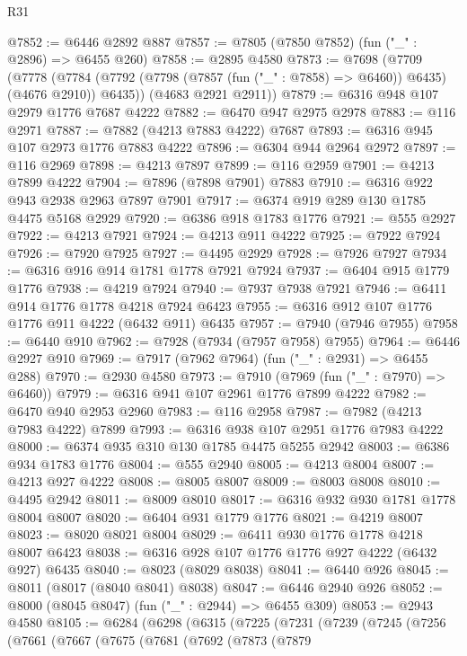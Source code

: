 \begin{lexlean}{R31}
\begin{coremodule}
@7852 := @6446 @2892 @887
@7857 := @7805 (@7850 @7852) (fun ("_" : @2896) => @6455 @260)
@7858 := @2895 @4580
@7873 := @7698
    (@7709
      (@7778 (@7784 (@7792 (@7798 (@7857 (fun ("_" : @7858) => @6460)) @6435) (@4676 @2910)) @6435))
      (@4683 @2921 @2911))
@7879 := @6316 @948 @107 @2979 @1776 @7687 @4222
@7882 := @6470 @947 @2975 @2978
@7883 := @116 @2971
@7887 := @7882 (@4213 @7883 @4222) @7687
@7893 := @6316 @945 @107 @2973 @1776 @7883 @4222
@7896 := @6304 @944 @2964 @2972
@7897 := @116 @2969
@7898 := @4213 @7897
@7899 := @116 @2959
@7901 := @4213 @7899 @4222
@7904 := @7896 (@7898 @7901) @7883
@7910 := @6316 @922 @943 @2938 @2963 @7897 @7901
@7917 := @6374 @919 @289 @130 @1785 @4475 @5168 @2929
@7920 := @6386 @918 @1783 @1776
@7921 := @555 @2927
@7922 := @4213 @7921
@7924 := @4213 @911 @4222
@7925 := @7922 @7924
@7926 := @7920 @7925
@7927 := @4495 @2929
@7928 := @7926 @7927
@7934 := @6316 @916 @914 @1781 @1778 @7921 @7924
@7937 := @6404 @915 @1779 @1776
@7938 := @4219 @7924
@7940 := @7937 @7938 @7921
@7946 := @6411 @914 @1776 @1778 @4218 @7924 @6423
@7955 := @6316 @912 @107 @1776 @1776 @911 @4222 (@6432 @911) @6435
@7957 := @7940 (@7946 @7955)
@7958 := @6440 @910
@7962 := @7928 (@7934 (@7957 @7958) @7955)
@7964 := @6446 @2927 @910
@7969 := @7917 (@7962 @7964) (fun ("_" : @2931) => @6455 @288)
@7970 := @2930 @4580
@7973 := @7910 (@7969 (fun ("_" : @7970) => @6460))
@7979 := @6316 @941 @107 @2961 @1776 @7899 @4222
@7982 := @6470 @940 @2953 @2960
@7983 := @116 @2958
@7987 := @7982 (@4213 @7983 @4222) @7899
@7993 := @6316 @938 @107 @2951 @1776 @7983 @4222
@8000 := @6374 @935 @310 @130 @1785 @4475 @5255 @2942
@8003 := @6386 @934 @1783 @1776
@8004 := @555 @2940
@8005 := @4213 @8004
@8007 := @4213 @927 @4222
@8008 := @8005 @8007
@8009 := @8003 @8008
@8010 := @4495 @2942
@8011 := @8009 @8010
@8017 := @6316 @932 @930 @1781 @1778 @8004 @8007
@8020 := @6404 @931 @1779 @1776
@8021 := @4219 @8007
@8023 := @8020 @8021 @8004
@8029 := @6411 @930 @1776 @1778 @4218 @8007 @6423
@8038 := @6316 @928 @107 @1776 @1776 @927 @4222 (@6432 @927) @6435
@8040 := @8023 (@8029 @8038)
@8041 := @6440 @926
@8045 := @8011 (@8017 (@8040 @8041) @8038)
@8047 := @6446 @2940 @926
@8052 := @8000 (@8045 @8047) (fun ("_" : @2944) => @6455 @309)
@8053 := @2943 @4580
@8105 := @6284
    (@6298
      (@6315
        (@7225
          (@7231
            (@7239
              (@7245
                (@7256
                  (@7661
                    (@7667
                      (@7675
                        (@7681
                          (@7692
                            (@7873
                              (@7879

\end{coremodule}
\end{lexlean}
